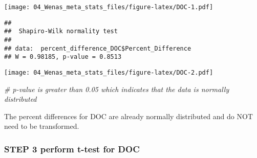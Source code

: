 \documentclass[
]{article}
\newenvironment{Shaded}{\begin{snugshade}}{\end{snugshade}}
\newcommand{\AttributeTok}[1]{\textcolor[rgb]{0.77,0.63,0.00}{#1}}
\newcommand{\CommentTok}[1]{\textcolor[rgb]{0.56,0.35,0.01}{\textit{#1}}}
\newcommand{\DecValTok}[1]{\textcolor[rgb]{0.00,0.00,0.81}{#1}}
\newcommand{\FunctionTok}[1]{\textcolor[rgb]{0.00,0.00,0.00}{#1}}
\newcommand{\NormalTok}[1]{#1}
\newcommand{\OtherTok}[1]{\textcolor[rgb]{0.56,0.35,0.01}{#1}}
\newcommand{\SpecialCharTok}[1]{\textcolor[rgb]{0.00,0.00,0.00}{#1}}
\newcommand{\StringTok}[1]{\textcolor[rgb]{0.31,0.60,0.02}{#1}}
\begin{document}
\texttt{[image: 04\_Wenas\_meta\_stats\_files/figure-latex/DOC-1.pdf]}

\begin{Shaded}
\end{Shaded}

\begin{verbatim}
## 
##  Shapiro-Wilk normality test
## 
## data:  percent_difference_DOC$Percent_Difference
## W = 0.98185, p-value = 0.8513
\end{verbatim}

\begin{Shaded}
\end{Shaded}

\texttt{[image: 04\_Wenas\_meta\_stats\_files/figure-latex/DOC-2.pdf]}

\begin{Shaded}
\begin{Highlighting}[]
\CommentTok{\# p{-}value is greater than 0.05 which indicates that the data is normally distributed}
\end{Highlighting}
\end{Shaded}

The percent differences for DOC are already normally distributed and do
NOT need to be transformed.

\hypertarget{step-3-perform-t-test-for-doc}{%
\subsubsection{STEP 3 perform t-test for
DOC}\label{step-3-perform-t-test-for-doc}}

\begin{Shaded}
\end{Shaded}
\end{document}
